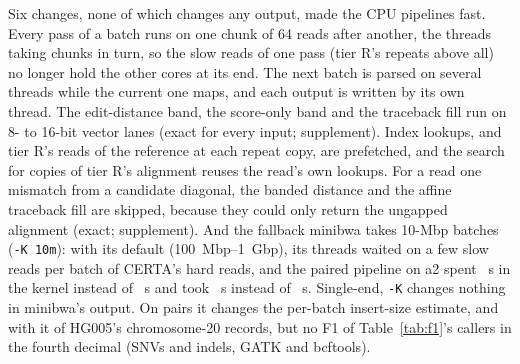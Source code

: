 \documentclass[11pt]{article}
\theoremstyle{definition}
\begin{document}
Six changes, none of which changes any output, made the CPU pipelines
fast. Every pass of a batch runs on one chunk of 64 reads after another,
the threads taking chunks in turn, so the slow reads of one pass (tier R's
repeats above all) no longer hold the other cores at its end. The next
batch is parsed on several threads while the current one maps, and each
output is written by its own thread. The edit-distance band, the
score-only band and the traceback fill run on 8- to 16-bit vector lanes
(exact for every input; supplement). Index lookups, and tier R's reads of
the reference at each repeat copy, are prefetched, and the search for
copies of tier R's alignment reuses the read's own lookups. For a read one
mismatch from a candidate diagonal, the banded distance and the affine
traceback fill are skipped, because they could only return the ungapped
alignment (exact; supplement). And the fallback
minibwa takes 10-Mbp batches (\texttt{-K 10m}): with its default
(100~Mbp--1~Gbp), its threads waited on a few slow reads per batch of
CERTA's hard reads, and the paired pipeline on a2 spent \FAPCpuKdSys~s in
the kernel instead of \FAPCpuKtSys~s and took \FAPCpuKdWall~s instead of
\FAPCpuKtWall~s.
Single-end, \texttt{-K} changes nothing in minibwa's output. On pairs it
changes the per-batch insert-size estimate, and with it \KbatchDiffRecords{}
of HG005's chromosome-20 records, but no F1 of
Table~\ref{tab:f1}'s callers in the fourth decimal (SNVs and indels, GATK
and bcftools).
\end{document}
